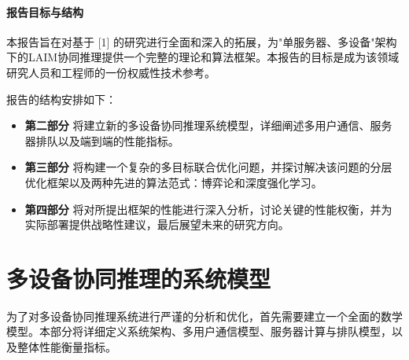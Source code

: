 \documentclass[11pt, a4paper]{article}
\begin{document}
\subsection{报告目标与结构}

本报告旨在对基于 [1] 的研究进行全面和深入的拓展，为"单服务器、多设备"架构下的LAIM协同推理提供一个完整的理论和算法框架。本报告的目标是成为该领域研究人员和工程师的一份权威性技术参考。

报告的结构安排如下：

\begin{itemize}
\item \textbf{第二部分} 将建立新的多设备协同推理系统模型，详细阐述多用户通信、服务器排队以及端到端的性能指标。

\item \textbf{第三部分} 将构建一个复杂的多目标联合优化问题，并探讨解决该问题的分层优化框架以及两种先进的算法范式：博弈论和深度强化学习。

\item \textbf{第四部分} 将对所提出框架的性能进行深入分析，讨论关键的性能权衡，并为实际部署提供战略性建议，最后展望未来的研究方向。
\end{itemize}

\part{多设备协同推理的系统模型}

为了对多设备协同推理系统进行严谨的分析和优化，首先需要建立一个全面的数学模型。本部分将详细定义系统架构、多用户通信模型、服务器计算与排队模型，以及整体性能衡量指标。
\end{document}
